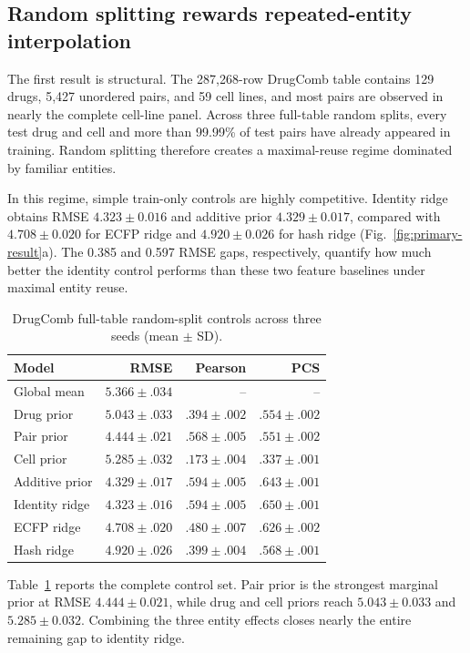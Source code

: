 \documentclass[conference]{IEEEtran}
\begin{document}
\subsection{Random splitting rewards repeated-entity interpolation}

The first result is structural. The 287,268-row DrugComb table contains 129 drugs, 5,427 unordered pairs, and 59 cell lines, and most pairs are observed in nearly the complete cell-line panel. Across three full-table random splits, every test drug and cell and more than 99.99\% of test pairs have already appeared in training. Random splitting therefore creates a maximal-reuse regime dominated by familiar entities.

In this regime, simple train-only controls are highly competitive. Identity ridge obtains RMSE $4.323\pm0.016$ and additive prior $4.329\pm0.017$, compared with $4.708\pm0.020$ for ECFP ridge and $4.920\pm0.026$ for hash ridge (Fig.~\ref{fig:primary-result}a). The 0.385 and 0.597 RMSE gaps, respectively, quantify how much better the identity control performs than these two feature baselines under maximal entity reuse.

\begin{table}[!t]
\centering
\scriptsize
\caption{DrugComb full-table random-split controls across three seeds (mean $\pm$ SD).}
\label{tab:drugcomb-controls}
\begin{tabular}{lrrr}
\toprule
Model & RMSE & Pearson & PCS \\
\midrule
Global mean & $5.366\pm.034$ & -- & -- \\
Drug prior & $5.043\pm.033$ & $.394\pm.002$ & $.554\pm.002$ \\
Pair prior & $4.444\pm.021$ & $.568\pm.005$ & $.551\pm.002$ \\
Cell prior & $5.285\pm.032$ & $.173\pm.004$ & $.337\pm.001$ \\
Additive prior & $4.329\pm.017$ & $.594\pm.005$ & $.643\pm.001$ \\
Identity ridge & $4.323\pm.016$ & $.594\pm.005$ & $.650\pm.001$ \\
ECFP ridge & $4.708\pm.020$ & $.480\pm.007$ & $.626\pm.002$ \\
Hash ridge & $4.920\pm.026$ & $.399\pm.004$ & $.568\pm.001$ \\
\bottomrule
\end{tabular}
\end{table}

Table~\ref{tab:drugcomb-controls} reports the complete control set. Pair prior is the strongest marginal prior at RMSE $4.444\pm0.021$, while drug and cell priors reach $5.043\pm0.033$ and $5.285\pm0.032$. Combining the three entity effects closes nearly the entire remaining gap to identity ridge.
\end{document}
